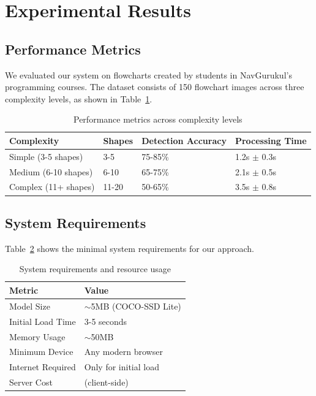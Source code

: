 \documentclass[11pt,a4paper]{article}
\begin{document}
\section{Experimental Results}

\subsection{Performance Metrics}

We evaluated our system on flowcharts created by students in NavGurukul's programming courses. The dataset consists of 150 flowchart images across three complexity levels, as shown in Table~\ref{tab:performance}.

\begin{table}[h]
\centering
\caption{Performance metrics across complexity levels}
\label{tab:performance}
\begin{tabular}{@{}llll@{}}
\toprule
\textbf{Complexity} & \textbf{Shapes} & \textbf{Detection Accuracy} & \textbf{Processing Time} \\
\midrule
Simple (3-5 shapes) & 3-5 & 75-85\% & 1.2s $\pm$ 0.3s \\
Medium (6-10 shapes) & 6-10 & 65-75\% & 2.1s $\pm$ 0.5s \\
Complex (11+ shapes) & 11-20 & 50-65\% & 3.5s $\pm$ 0.8s \\
\bottomrule
\end{tabular}
\end{table}

\subsection{System Requirements}

Table~\ref{tab:requirements} shows the minimal system requirements for our approach.

\begin{table}[h]
\centering
\caption{System requirements and resource usage}
\label{tab:requirements}
\begin{tabular}{@{}ll@{}}
\toprule
\textbf{Metric} & \textbf{Value} \\
\midrule
Model Size & $\sim$5MB (COCO-SSD Lite) \\
Initial Load Time & 3-5 seconds \\
Memory Usage & $\sim$50MB \\
Minimum Device & Any modern browser \\
Internet Required & Only for initial load \\
Server Cost & \rupee0 (client-side) \\
\bottomrule
\end{tabular}
\end{table}
\end{document}
